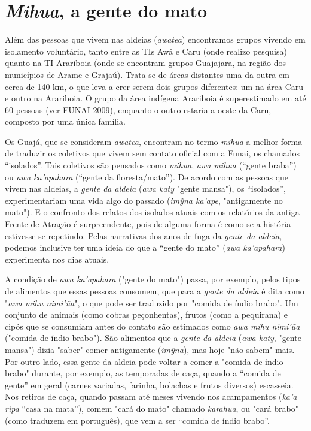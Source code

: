 \section{\emph{Mihua}, a gente do mato}

Além das pessoas que vivem nas aldeias (\emph{awatea}) encontramos
grupos vivendo em isolamento voluntário, tanto entre as TIs Awá e Caru
(onde realizo pesquisa) quanto na TI Arariboia (onde se encontram grupos
Guajajara, na região dos municípios de Arame e Grajaú). Trata-se de
áreas distantes uma da outra em cerca de 140 km, o que leva a crer serem
dois grupos diferentes: um na área Caru e outro na Arariboia. O grupo da
área indígena Arariboia é superestimado em até 60 pessoas (ver FUNAI
2009), enquanto o outro estaria a oeste da Caru, composto por uma única
família.

Os Guajá, que se consideram \emph{awatea}, encontram no termo
\emph{mihua} a melhor forma de traduzir os coletivos que vivem sem
contato oficial com a Funai, os chamados ``isolados''. Tais coletivos
são pensados como \emph{mihua}, \emph{awa mihua} (``gente braba'') ou
\emph{awa ka'apahara} (``gente da floresta/mato''). De acordo com as
pessoas que vivem nas aldeias, a \emph{gente da aldeia} (\emph{awa katy}
"gente mansa"), os ``isolados'', experimentariam uma vida algo do
passado (\emph{imỹna ka'ape}, "antigamente no mato"). E o confronto dos
relatos dos isolados atuais com os relatórios da antiga Frente de
Atração é surpreendente, pois de alguma forma é como se a história
estivesse se repetindo. Pelas narrativas dos anos de fuga da \emph{gente
da aldeia}, podemos inclusive ter uma ideia do que a ``gente do mato''
(\emph{awa ka'apahara}) experimenta nos dias atuais.

A condição de \emph{awa ka'apahara} ("gente do mato") passa, por
exemplo, pelos tipos de alimentos que essas pessoas consomem, que para a
\emph{gente da aldeia} é dita como "\emph{awa mihu nimi'ũa}", o que pode
ser traduzido por "comida de índio brabo". Um conjunto de animais (como
cobras peçonhentas), frutos (como a pequirana) e cipós que se consumiam
antes do contato são estimados como \emph{awa mihu nimi'ũa} ("comida de
índio brabo"). São alimentos que a \emph{gente da aldeia} (\emph{awa
katy}, "gente mansa") dizia "saber" comer antigamente (\emph{imỹna}),
mas hoje "não sabem" mais. Por outro lado, essa gente da aldeia pode
voltar a comer a "comida de índio brabo" durante, por exemplo, as
temporadas de caça, quando a ``comida de gente'' em geral (carnes
variadas, farinha, bolachas e frutos diversos) escasseia. Nos retiros de
caça, quando passam até meses vivendo nos acampamentos (\emph{ka'a ripa}
``casa na mata''), comem "cará do mato" chamado \emph{karahua}, ou "cará
brabo" (como traduzem em português), que vem a ser ``comida de índio
brabo''.

